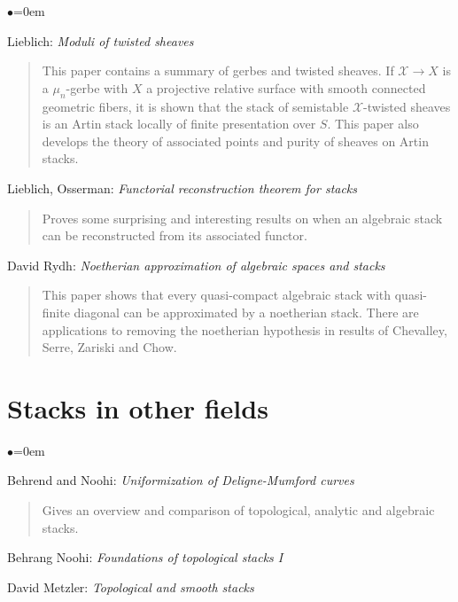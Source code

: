 \begin{list}{$\bullet$}{\leftmargin=0em}
\item Lieblich: \emph{Moduli of twisted sheaves} \cite{lieblich_twisted}
\begin{quote}
This paper contains a summary of gerbes and twisted sheaves.
If $\mathcal{X} \rightarrow X$ is a $\mu_n$-gerbe with $X$ a projective
relative surface with smooth connected geometric fibers, it is shown that
the stack of semistable $\mathcal{X}$-twisted sheaves is an Artin stack
locally of finite presentation over $S$.  This paper also develops the
theory of associated points and purity of sheaves on Artin stacks.  
\end{quote}
\smallskip
\item Lieblich, Osserman:
\emph{Functorial reconstruction theorem for stacks}
\cite{lieblich-osserman}
\begin{quote}
Proves some surprising and interesting results on 
when an algebraic stack can be reconstructed from its associated functor. 
\end{quote}
\smallskip
\item David Rydh:
\emph{Noetherian approximation of algebraic spaces and stacks}
\cite{rydh_approx}
\begin{quote}
This paper shows that every quasi-compact algebraic stack
with quasi-finite diagonal can be approximated by a noetherian stack.
There are applications to removing the noetherian hypothesis in results
of Chevalley, Serre, Zariski and Chow.  
\end{quote}
\end{list}



\section{Stacks in other fields}
\label{section-stacks-areas}

\begin{list}{$\bullet$}{\leftmargin=0em}
\item Behrend and Noohi: \emph{Uniformization of Deligne-Mumford curves}
\cite{behrend-noohi}
\begin{quote}
Gives an overview and comparison of topological, analytic and algebraic stacks.
\end{quote}
\smallskip

\item Behrang Noohi: \emph{Foundations of topological stacks I} \cite{noohi}
\smallskip
\item David Metzler: \emph{Topological and smooth stacks} \cite{metzler}
\end{list}


